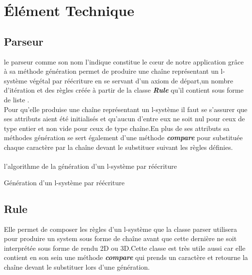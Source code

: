 \chapter{Élément Technique}
\section{Parseur}
le parseur comme son nom l'indique constitue le cœur de notre application grâce à sa méthode 
génération permet de produire une chaîne  représentant un l-système végétal par réécriture en se servant d'un axiom de départ,un nombre d'itération  et des règles créée à partir de la classe \textbf{\em Rule} qu'il contient sous forme de liste .
\\
Pour qu'elle produise une chaîne représentant un l-système il faut se s'assurer que ses attributs aient été initialisés et qu'aucun d'entre eux  ne soit nul pour ceux de type entier et non vide pour ceux de type chaîne.En plus de ses attributs sa méthodes génération se sert également d'une méthode \textbf{\em compare} pour substituée chaque caractère par la chaîne devant le substituer suivant les règles définies.
\\
\\
l'algorithme de la génération d'un l-système par réécriture 
\\
	\begin{algorithm}
		\DontPrintSemicolon 
		\caption {Génération d'un l-système par réécriture  }
		\;
	\end{algorithm}
\section{Rule}
Elle permet de composer les règles d'un l-système  que la classe parser utilisera pour produire un system sous forme de chaîne avant que cette dernière ne soit interprétée  sous forme de rendu 2D ou 3D.Cette classe est très utile aussi car elle contient en son sein une méthode \textbf{\em compare} qui prends un caractère et retourne la chaîne devant le substituer lors d'une génération.


